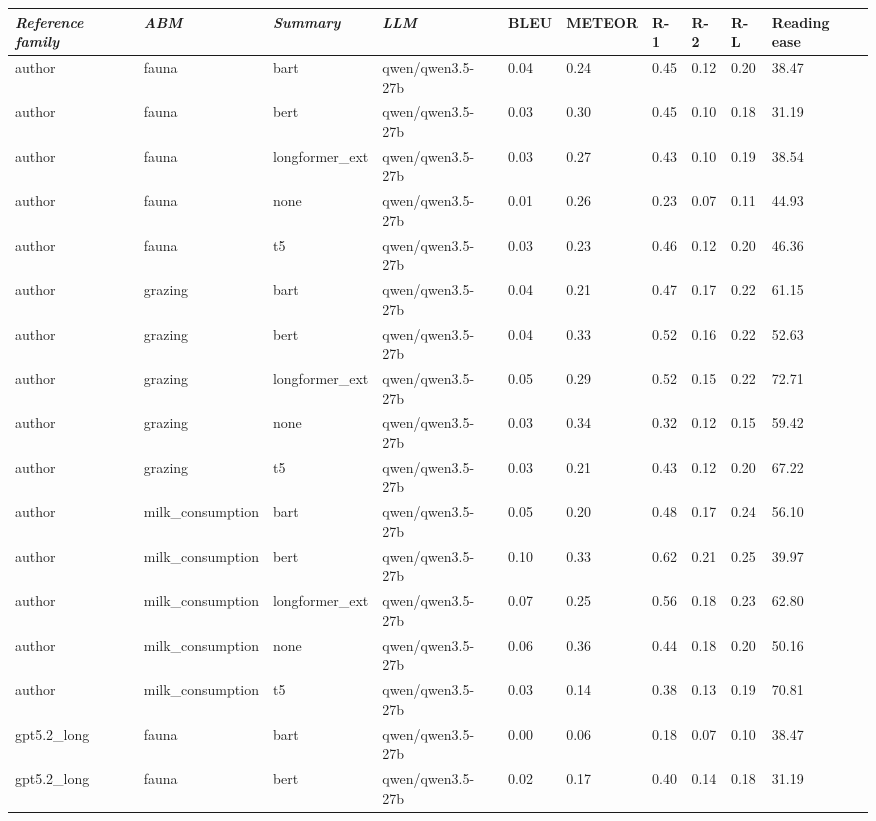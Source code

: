 \begin{tabular}{|l|l|l|l|l|l|l|l|l|l|}
\hline
\textit{\textbf{Reference family}} & \textit{\textbf{ABM}} & \textit{\textbf{Summary}} & \textit{\textbf{LLM}} & BLEU & METEOR & R-1 & R-2 & R-L & Reading ease \\
 \hline
 author & fauna & bart & qwen/qwen3.5-27b & 0.04 & 0.24 & 0.45 & 0.12 & 0.20 & 38.47 \\
 \hline
 author & fauna & bert & qwen/qwen3.5-27b & 0.03 & 0.30 & 0.45 & 0.10 & 0.18 & 31.19 \\
 \hline
 author & fauna & longformer\_ext & qwen/qwen3.5-27b & 0.03 & 0.27 & 0.43 & 0.10 & 0.19 & 38.54 \\
 \hline
 author & fauna & none & qwen/qwen3.5-27b & 0.01 & 0.26 & 0.23 & 0.07 & 0.11 & 44.93 \\
 \hline
 author & fauna & t5 & qwen/qwen3.5-27b & 0.03 & 0.23 & 0.46 & 0.12 & 0.20 & 46.36 \\
 \hline
 author & grazing & bart & qwen/qwen3.5-27b & 0.04 & 0.21 & 0.47 & 0.17 & 0.22 & 61.15 \\
 \hline
 author & grazing & bert & qwen/qwen3.5-27b & 0.04 & 0.33 & 0.52 & 0.16 & 0.22 & 52.63 \\
 \hline
 author & grazing & longformer\_ext & qwen/qwen3.5-27b & 0.05 & 0.29 & 0.52 & 0.15 & 0.22 & 72.71 \\
 \hline
 author & grazing & none & qwen/qwen3.5-27b & 0.03 & 0.34 & 0.32 & 0.12 & 0.15 & 59.42 \\
 \hline
 author & grazing & t5 & qwen/qwen3.5-27b & 0.03 & 0.21 & 0.43 & 0.12 & 0.20 & 67.22 \\
 \hline
 author & milk\_consumption & bart & qwen/qwen3.5-27b & 0.05 & 0.20 & 0.48 & 0.17 & 0.24 & 56.10 \\
 \hline
 author & milk\_consumption & bert & qwen/qwen3.5-27b & 0.10 & 0.33 & 0.62 & 0.21 & 0.25 & 39.97 \\
 \hline
 author & milk\_consumption & longformer\_ext & qwen/qwen3.5-27b & 0.07 & 0.25 & 0.56 & 0.18 & 0.23 & 62.80 \\
 \hline
 author & milk\_consumption & none & qwen/qwen3.5-27b & 0.06 & 0.36 & 0.44 & 0.18 & 0.20 & 50.16 \\
 \hline
 author & milk\_consumption & t5 & qwen/qwen3.5-27b & 0.03 & 0.14 & 0.38 & 0.13 & 0.19 & 70.81 \\
 \hline
 gpt5.2\_long & fauna & bart & qwen/qwen3.5-27b & 0.00 & 0.06 & 0.18 & 0.07 & 0.10 & 38.47 \\
 \hline
 gpt5.2\_long & fauna & bert & qwen/qwen3.5-27b & 0.02 & 0.17 & 0.40 & 0.14 & 0.18 & 31.19 \\

\end{tabular}
